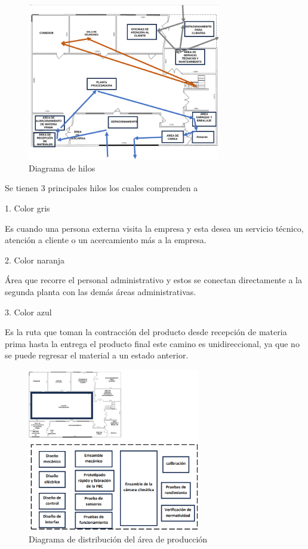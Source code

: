 \begin{figure}[H]
    \centering	
    \includegraphics[angle=90,width=0.75\textwidth]{chapters/ELC_HILOS.png} 
    \caption{Diagrama de hilos}
\label{fig:croquis190125}
\end{figure}

Se tienen 3 principales hilos los cuales comprenden a 

1. Color gris

Es cuando una persona externa visita la empresa y esta desea un servicio técnico, atención a cliente o un acercamiento más a la empresa.

2. Color naranja

Área que recorre el personal administrativo y estos se conectan directamente a la segunda planta con las demás áreas administrativas.

3. Color azul 

Es la ruta que toman la contracción del producto desde recepción de materia prima hasta la entrega el producto final este camino es unidireccional, ya que no se puede regresar el material a un estado anterior. 

\begin{figure}[H]
    \centering	
    \includegraphics[angle=0,width=0.67\textwidth]{chapters/ELC_DIAGRAM.png} 
    \caption{Diagrama de distribución del área de producción}
\label{fig:croquis190125}
\end{figure}

